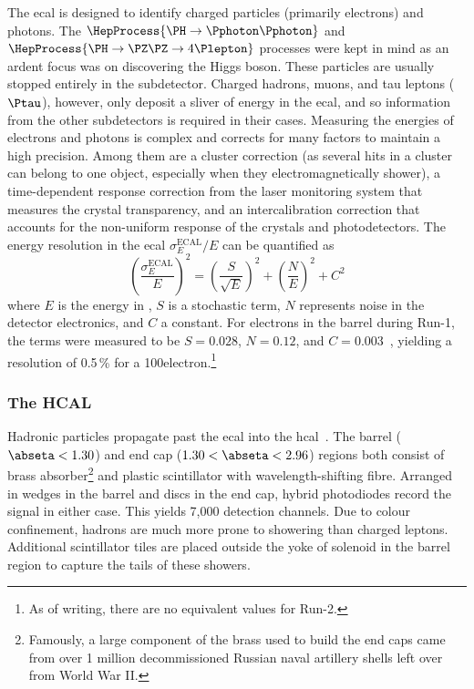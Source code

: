 The \acrshort{ecal} is designed to identify charged particles (primarily electrons) and photons. The $\HepProcess{\PH \to \Pphoton\Pphoton}$ and $\HepProcess{\PH \to \PZ\PZ \to 4\Plepton}$ processes were kept in mind as an ardent focus was on discovering the Higgs boson. These particles are usually stopped entirely in the subdetector. Charged hadrons, muons, and tau leptons ($\Ptau$), however, only deposit a sliver of energy in the \acrshort{ecal}, and so information from the other subdetectors is required in their cases. Measuring the energies of electrons and photons is complex and corrects for many factors to maintain a high precision. Among them are a cluster correction (as several hits in a cluster can belong to one object, especially when they electromagnetically shower), a time-dependent response correction from the laser monitoring system that measures the crystal transparency, and an intercalibration correction that accounts for the non-uniform response of the crystals and photodetectors. The energy resolution in the \acrshort{ecal} $\sigma_E^{\mathrm{ECAL}} / E$ can be quantified as
\begin{equation}
    \left( \frac{\sigma_E^{\mathrm{ECAL}}}{E} \right)^2 = \left( \frac{S}{\sqrt{E}} \right)^2 + \left( \frac{N}{E} \right)^2 + C^2
    \label{eq:ecal_resolution}
\end{equation}
where $E$ is the energy in \GeVns, $S$ is a stochastic term, $N$ represents noise in the detector electronics, and $C$ a constant. For electrons in the barrel during Run-1, the terms were measured to be $S = \text{0.028}$, $N = \text{0.12}$, and $C = \text{0.003}$~\cite{Ingram_2007}, yielding a resolution of 0.5\,\% for a 100\GeV electron.\footnote{As of writing, there are no equivalent values for Run-2.}





\subsubsection{The HCAL}
\label{subsubsec:cms_hcal}

Hadronic particles propagate past the \acrshort{ecal} into the \acrshort{hcal}~\cite{CERN-LHCC-97-031}. The barrel ($\abseta < \text{1.30}$) and end cap ($\text{1.30} < \abseta < \text{2.96}$) regions both consist of brass absorber\footnote{Famously, a large component of the brass used to build the end caps came from over 1 million decommissioned Russian naval artillery shells left over from World War II.} and plastic scintillator with wavelength-shifting fibre. Arranged in wedges in the barrel and discs in the end cap, hybrid photodiodes record the signal in either case. This yields 7,000 detection channels. Due to colour confinement, hadrons are much more prone to showering than charged leptons. Additional scintillator tiles are placed outside the yoke of solenoid in the barrel region to capture the tails of these showers.

